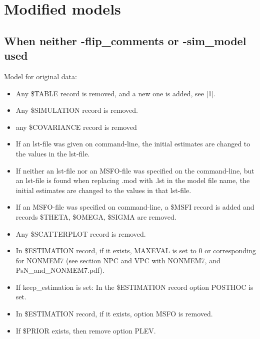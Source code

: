 \section{Modified models}

\subsection{When neither -flip\_comments or -sim\_model used}
Model for original data:  
\begin{itemize}
	\item Any \$TABLE record is removed, and a new one is added, see [1].
	\item Any \$SIMULATION record is removed.
	\item any \$COVARIANCE record is removed
	\item If an lst-file was given on command-line, the initial estimates are changed to the values in the lst-file. 
	\item If neither an lst-file nor an MSFO-file was specified on the command-line, but an lst-file is found when replacing .mod with .lst in the model file name, the initial estimates are changed to the values in that lst-file.
	\item If an MSFO-file was specified on command-line, a \$MSFI record is added and records \$THETA, \$OMEGA, \$SIGMA are removed.  
	\item Any \$SCATTERPLOT record is removed.
	\item In \$ESTIMATION record, if it exists, MAXEVAL is set to 0 or corresponding for  NONMEM7 (see section NPC and VPC with NONMEM7, and PsN\_and\_NONMEM7.pdf). 
	\item If keep\_estimation is set: In the \$ESTIMATION record option POSTHOC is set.
	\item In \$ESTIMATION record, if it exists, option MSFO is removed.
	\item If \$PRIOR exists, then remove option PLEV.
\end{itemize}

